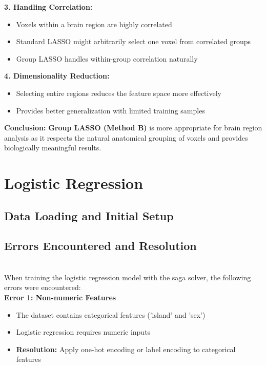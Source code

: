 \documentclass[12pt]{article}
\begin{document}
\textbf{3. Handling Correlation:}
\begin{itemize}
    \item Voxels within a brain region are highly correlated
    \item Standard LASSO might arbitrarily select one voxel from correlated groups
    \item Group LASSO handles within-group correlation naturally
\end{itemize}

\textbf{4. Dimensionality Reduction:}
\begin{itemize}
    \item Selecting entire regions reduces the feature space more effectively
    \item Provides better generalization with limited training samples
\end{itemize}

\textbf{Conclusion:} \textbf{Group LASSO (Method B)} is more appropriate for brain region analysis as it respects the natural anatomical grouping of voxels and provides biologically meaningful results.

\section{Logistic Regression}

\subsection{Data Loading and Initial Setup}
\subsection{Errors Encountered and Resolution}\\

When training the logistic regression model with the saga solver, the following errors were encountered:\\

\textbf{Error 1: Non-numeric Features}
\begin{itemize}
    \item The dataset contains categorical features ('island' and 'sex')
    \item Logistic regression requires numeric inputs
    \item \textbf{Resolution:} Apply one-hot encoding or label encoding to categorical features
\end{itemize}
\end{document}
